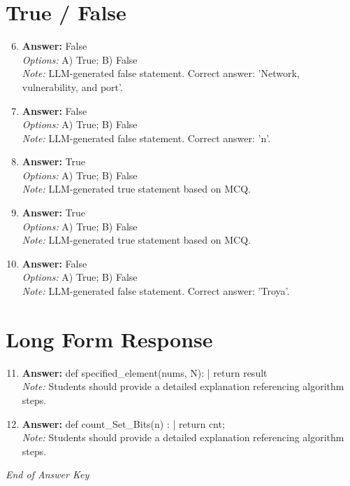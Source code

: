 \documentclass[12pt]{article}
\begin{document}
\section*{True / False}
\begin{enumerate}[label=\arabic*.]
\setcounter{enumi}{5}
\item \textbf{Answer:} False
\\ \textit{Options:} A) True; B) False
\\ \textit{Note:} LLM-generated false statement. Correct answer: 'Network, vulnerability, and port'.
\item \textbf{Answer:} False
\\ \textit{Options:} A) True; B) False
\\ \textit{Note:} LLM-generated false statement. Correct answer: 'n'.
\item \textbf{Answer:} True
\\ \textit{Options:} A) True; B) False
\\ \textit{Note:} LLM-generated true statement based on MCQ.
\item \textbf{Answer:} True
\\ \textit{Options:} A) True; B) False
\\ \textit{Note:} LLM-generated true statement based on MCQ.
\item \textbf{Answer:} False
\\ \textit{Options:} A) True; B) False
\\ \textit{Note:} LLM-generated false statement. Correct answer: 'Troya'.
\end{enumerate}

\section*{Long Form Response}
\begin{enumerate}[label=\arabic*.]
\setcounter{enumi}{10}
\item \textbf{Answer:} def specified\_element(nums, N): | return result
\\ \textit{Note:} Students should provide a detailed explanation referencing algorithm steps.
\item \textbf{Answer:} def count\_Set\_Bits(n) : | return cnt;
\\ \textit{Note:} Students should provide a detailed explanation referencing algorithm steps.
\end{enumerate}

\vfill
\noindent\textit{End of Answer Key}
\end{document}
